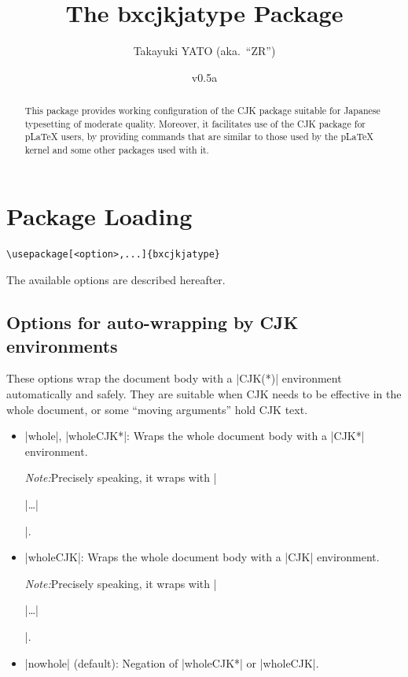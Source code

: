 \documentclass[a4paper]{article}
\newcommand{\PkgVersion}{0.5a}
\newcommand{\PkgDate}{2026/03/31}
\newcommand{\Pkg}[1]{\textsf{#1}}
\newcommand{\Note}{\par\noindent \emph{Note:}\quad}
\newcommand{\Means}{:\hspace{1em plus 1em}}
\newcommand{\wbr}{\linebreak[0]}
\providecommand{\pLaTeX}{p\LaTeX}
\begin{document}
\title{The \Pkg{bxcjkjatype} Package}
\author{Takayuki YATO (aka.~``ZR'')}
\date{v\PkgVersion\quad[\PkgDate]}
\maketitle

\begin{abstract}
This package provides working configuration of the \Pkg{CJK} package
suitable for Japanese typesetting of moderate quality.
Moreover, it facilitates use of the \Pkg{CJK} package for {\pLaTeX}
users, by providing commands that are similar to those used by the
{\pLaTeX} kernel and some other packages used with it.
\end{abstract}

\tableofcontents

\section{Package Loading}
\label{sec:loading}

\begin{verbatim}
\usepackage[<option>,...]{bxcjkjatype}
\end{verbatim}

The available options are described hereafter.

\subsection{Options for auto-wrapping by CJK environments}

These options wrap the document body with a |CJK(*)|
environment automatically and safely.
They are suitable
when CJK needs to be effective in the whole document,
or some ``moving arguments'' hold CJK text.

\begin{itemize}
\item |whole|, |wholeCJK*|\Means
  Wraps the whole document body with a |CJK*| environment.
  \Note Precisely speaking,
  it wraps with |\begin{uCJK*}|\ldots\wbr|\end{uCJK*}|.
\item |wholeCJK|\Means
  Wraps the whole document body with a |CJK| environment.
  \Note Precisely speaking,
  it wraps with |\begin{uCJK}|\ldots\wbr|\end{uCJK}|.
\item |nowhole| (default)\Means
  Negation of |wholeCJK*| or |wholeCJK|.
\end{itemize}
\end{document}
